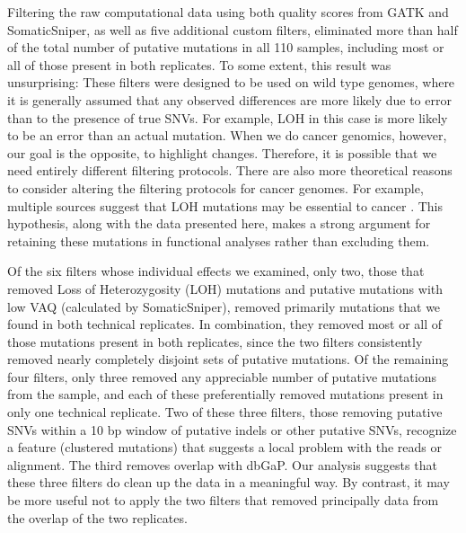 \documentclass[11pt]{article} %
\begin{document}
Filtering the raw computational data using both quality scores from GATK and SomaticSniper, as well as five additional custom filters, eliminated more than half of the total number of putative mutations in all 110 samples, including most or all of those present in both replicates. To some extent, this result was unsurprising: These filters were designed to be used on wild type genomes, where it is generally assumed that any observed differences are more likely due to error than to the presence of true SNVs. For example, LOH in this case is more likely to be an error than an actual mutation. When we do cancer genomics, however, our goal is the opposite, to highlight changes. Therefore, it is possible that we need entirely different filtering protocols. There are also more theoretical reasons to consider altering the filtering protocols for cancer genomes. For example, multiple sources suggest that LOH mutations may be essential to cancer \citep{LOH}. This hypothesis, along with the data presented here, makes a strong argument for retaining these mutations in functional analyses rather than excluding them.

Of the six filters whose individual effects we examined, only two, those that removed Loss of Heterozygosity (LOH) mutations and putative mutations with low VAQ (calculated by SomaticSniper), removed primarily mutations that we found in both technical replicates. In combination, they removed most or all of those mutations present in both replicates, since the two filters consistently removed nearly completely disjoint sets of putative mutations. Of the remaining four filters, only three removed any appreciable number of putative mutations from the sample, and each of these preferentially removed mutations present in only one technical replicate. Two of these three filters, those removing putative SNVs within a 10 bp window of putative indels or other putative SNVs, recognize a feature (clustered mutations) that suggests a local problem with the reads or alignment. The third removes overlap with dbGaP.  Our analysis suggests that these three filters do clean up the data in a meaningful way. By contrast, it may be more useful not to apply the two filters that removed principally data from the overlap of the two replicates.
\end{document}
